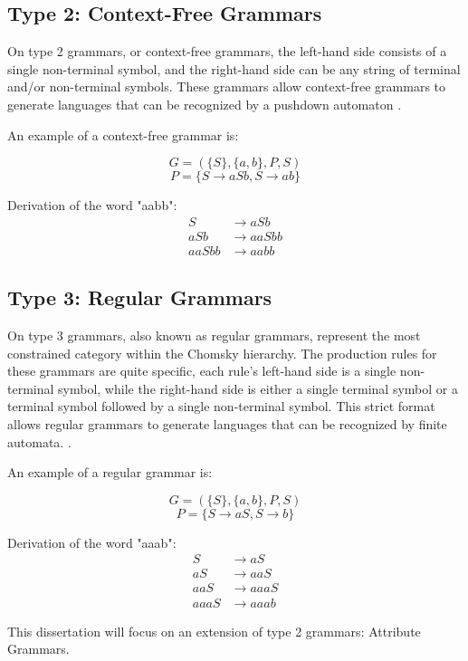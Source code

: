\subsection{Type 2: Context-Free Grammars}
\label{subsuc:type2}

On type 2 grammars, or context-free grammars, the left-hand side
consists of a single 
non-terminal symbol, and the right-hand side can be any string 
of terminal and/or non-terminal symbols. These grammars allow
context-free grammars to generate languages that can be 
recognized by a pushdown automaton \cite{cit9}. 

An example of a context-free grammar is:

\[ G = ( \{S\}, \{a, b\}, P, S ) \]
\[ P = \{ S \rightarrow aSb, S \rightarrow ab \} \]

Derivation of the word "aabb":
\[
\begin{aligned}
S &\rightarrow aSb \\
aSb &\rightarrow aaSbb \\
aaSbb &\rightarrow aabb
\end{aligned}
\]


\subsection{Type 3: Regular Grammars}

On type 3 grammars, also known as regular grammars, represent 
the most constrained category within the Chomsky hierarchy. 
The production rules for these grammars are quite specific, 
each rule's left-hand side is a single non-terminal symbol, 
while the right-hand side is either a single terminal symbol 
or a terminal symbol followed by a single non-terminal symbol. 
This strict format allows regular grammars to generate languages
that can be recognized by finite automata. \cite{cit9}. 

An example of a regular grammar is:

\[ G = ( \{S\}, \{a, b\}, P, S ) \]
\[ P = \{ S \rightarrow aS, S \rightarrow b \} \]

Derivation of the word "aaab":
\[
\begin{aligned}
S &\rightarrow aS \\
aS &\rightarrow aaS \\
aaS &\rightarrow aaaS \\
aaaS &\rightarrow aaab
\end{aligned}
\]

This dissertation will focus on an extension of type 2 grammars: Attribute Grammars.


